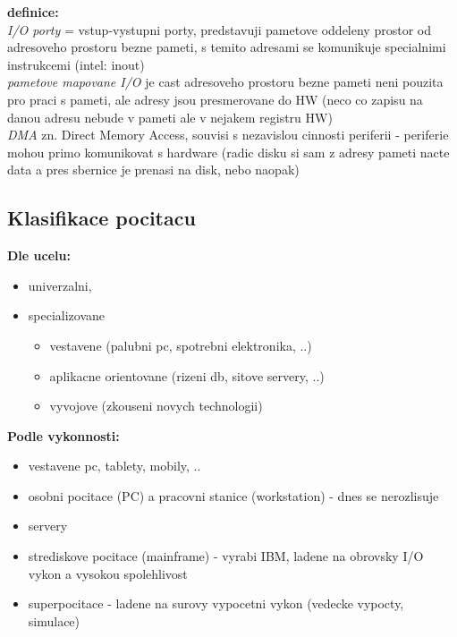 \documentclass[a4paper, 11pt]{article}
\begin{document}
\noindent\textbf{definice:} \\[0.5em] \label{i-o}
\textit{I/O porty} = vstup-vystupni porty, predstavuji pametove oddeleny prostor od adresoveho prostoru bezne pameti, s temito adresami se komunikuje specialnimi instrukcemi (intel: inout) \\[0.2em]
\textit{pametove mapovane I/O} je cast adresoveho prostoru bezne pameti neni pouzita pro praci s pameti, ale adresy jsou presmerovane do HW (neco co zapisu na danou adresu nebude v pameti ale v nejakem registru HW) \\[0.2em]
\textit{DMA} zn. Direct Memory Access, souvisi s nezavislou cinnosti periferii - periferie mohou primo komunikovat s hardware (radic disku si sam z adresy pameti nacte data a pres sbernice je prenasi na disk, nebo naopak) \\[0.2em]

\subsection{Klasifikace pocitacu}

\noindent\textbf{Dle ucelu:}
\begin{itemize}
    \item univerzalni,
    \item specializovane
    \begin{itemize}
        \item vestavene (palubni pc, spotrebni elektronika, ..)
        \item aplikacne orientovane (rizeni db, sitove servery, ..)
        \item vyvojove (zkouseni novych technologii) \\
    \end{itemize}
\end{itemize}

\noindent\textbf{Podle vykonnosti:}
\begin{itemize}
    \item vestavene pc, tablety, mobily, ..
    \item osobni pocitace (PC) a pracovni stanice (workstation) - dnes se nerozlisuje
    \item servery
    \item strediskove pocitace (mainframe) - vyrabi IBM, ladene na obrovsky I/O vykon a vysokou spolehlivost
    \item superpocitace - ladene na surovy vypocetni vykon (vedecke vypocty, simulace) \\
\end{itemize}
\end{document}
